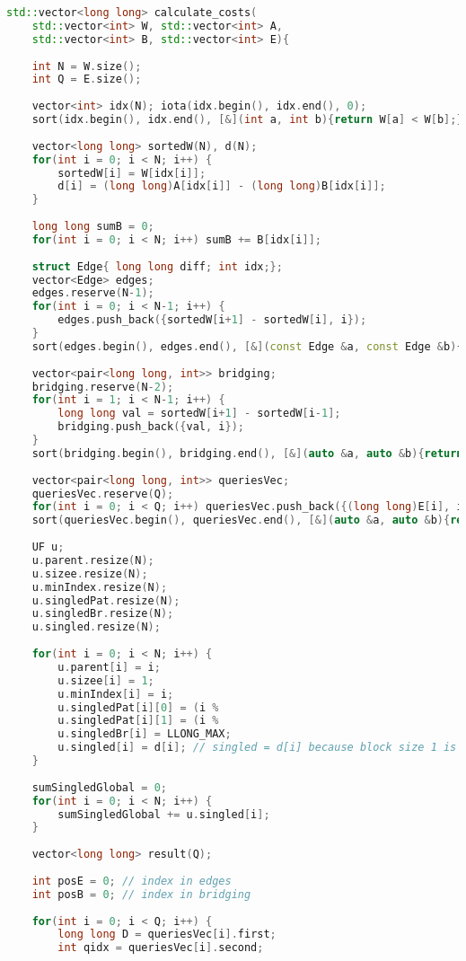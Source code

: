 \begin{lstlisting}[language=C++]
std::vector<long long> calculate_costs(
    std::vector<int> W, std::vector<int> A,
    std::vector<int> B, std::vector<int> E){
 
    int N = W.size();
    int Q = E.size();
 
    vector<int> idx(N); iota(idx.begin(), idx.end(), 0);
    sort(idx.begin(), idx.end(), [&](int a, int b){return W[a] < W[b];});
 
    vector<long long> sortedW(N), d(N);
    for(int i = 0; i < N; i++) {
        sortedW[i] = W[idx[i]];
        d[i] = (long long)A[idx[i]] - (long long)B[idx[i]];
    }
 
    long long sumB = 0;
    for(int i = 0; i < N; i++) sumB += B[idx[i]];
 
    struct Edge{ long long diff; int idx;};
    vector<Edge> edges;
    edges.reserve(N-1);
    for(int i = 0; i < N-1; i++) {
        edges.push_back({sortedW[i+1] - sortedW[i], i});
    }
    sort(edges.begin(), edges.end(), [&](const Edge &a, const Edge &b){return a.diff < b.diff;});
 
    vector<pair<long long, int>> bridging;
    bridging.reserve(N-2);
    for(int i = 1; i < N-1; i++) {
        long long val = sortedW[i+1] - sortedW[i-1];
        bridging.push_back({val, i});
    }
    sort(bridging.begin(), bridging.end(), [&](auto &a, auto &b){return a.first < b.first;});
 
    vector<pair<long long, int>> queriesVec;
    queriesVec.reserve(Q);
    for(int i = 0; i < Q; i++) queriesVec.push_back({(long long)E[i], i});
    sort(queriesVec.begin(), queriesVec.end(), [&](auto &a, auto &b){return a.first < b.first;});
 
    UF u;
    u.parent.resize(N);
    u.sizee.resize(N);
    u.minIndex.resize(N);
    u.singledPat.resize(N);
    u.singledBr.resize(N);
    u.singled.resize(N);
 
    for(int i = 0; i < N; i++) {
        u.parent[i] = i;
        u.sizee[i] = 1;
        u.minIndex[i] = i;
        u.singledPat[i][0] = (i %
        u.singledPat[i][1] = (i %
        u.singledBr[i] = LLONG_MAX;
        u.singled[i] = d[i]; // singled = d[i] because block size 1 is odd
    }
 
    sumSingledGlobal = 0;
    for(int i = 0; i < N; i++) {
        sumSingledGlobal += u.singled[i];
    }
 
    vector<long long> result(Q);
 
    int posE = 0; // index in edges
    int posB = 0; // index in bridging
 
    for(int i = 0; i < Q; i++) {
        long long D = queriesVec[i].first;
        int qidx = queriesVec[i].second;
 

\end{lstlisting}
